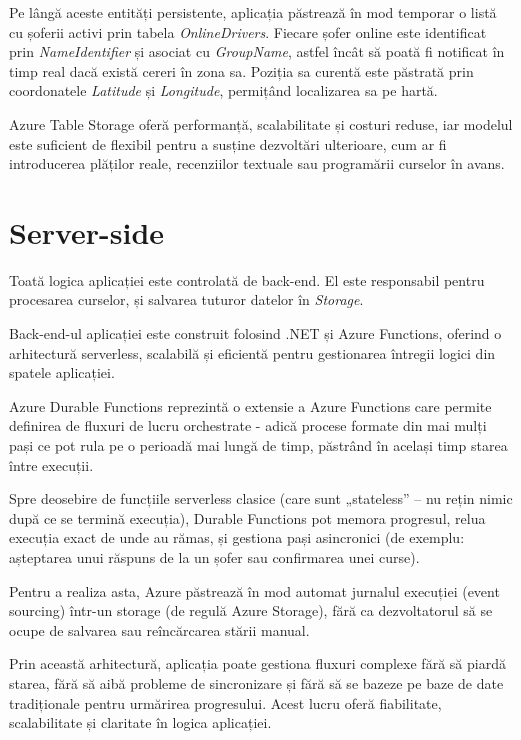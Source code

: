 Pe lângă aceste entități persistente, aplicația păstrează în mod temporar o listă cu șoferii activi prin tabela \textit{OnlineDrivers}.
Fiecare șofer online este identificat prin \textit{NameIdentifier} și asociat cu \textit{GroupName}, astfel încât să poată fi notificat
în timp real dacă există cereri în zona sa. Poziția sa curentă este păstrată prin coordonatele \textit{Latitude} și \textit{Longitude},
permițând localizarea sa pe hartă.

Azure Table Storage oferă performanță, scalabilitate și costuri reduse, iar modelul este suficient
de flexibil pentru a susține dezvoltări ulterioare, cum ar fi introducerea plăților reale, recenziilor textuale
sau programării curselor în avans.

\section{Server-side}

Toată logica aplicației este controlată de back-end. El este responsabil pentru procesarea curselor, și salvarea tuturor
datelor în \textit{Storage}.

Back-end-ul aplicației este construit folosind .NET și Azure Functions, oferind o arhitectură
serverless, scalabilă și eficientă pentru gestionarea întregii logici din spatele aplicației.

Azure Durable Functions reprezintă o extensie a Azure Functions care permite definirea de fluxuri de lucru 
orchestrate - adică procese formate din mai mulți pași ce pot rula pe o perioadă mai lungă de timp, păstrând în 
același timp starea între execuții.

Spre deosebire de funcțiile serverless clasice (care sunt „stateless” – nu rețin nimic după ce se termină execuția), 
Durable Functions pot memora progresul, relua execuția exact de unde au rămas, și gestiona pași asincronici 
(de exemplu: așteptarea unui răspuns de la un șofer sau confirmarea unei curse).

Pentru a realiza asta, Azure păstrează în mod automat jurnalul execuției (event sourcing) într-un storage 
(de regulă Azure Storage), fără ca dezvoltatorul să se ocupe de salvarea sau reîncărcarea stării manual.

Prin această arhitectură, aplicația poate gestiona fluxuri complexe fără să piardă starea, 
fără să aibă probleme de sincronizare și fără să se bazeze pe baze de date tradiționale pentru urmărirea progresului. 
Acest lucru oferă fiabilitate, scalabilitate și claritate în logica aplicației.

